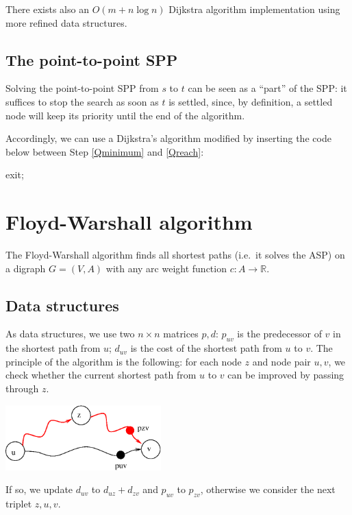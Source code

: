 \documentclass[a4paper]{book}
\theoremstyle{changebreak}                %
\begin{document}
There exists also an $O(m+n\log n)$ Dijkstra
algorithm implementation using more refined
data structures.

\subsection{The point-to-point SPP}
Solving the point-to-point SPP from $s$ to $t$ can be
seen as a ``part'' of the SPP: it suffices to stop the search as soon
as $t$ is settled, since, by definition, a settled node will keep its
priority until the end of the algorithm.

Accordingly, we can use a Dijkstra's
algorithm modified by inserting the code
below between Step \ref{Qminimum} and \ref{Qreach}:
\begin{algorithmic}
  \STATE exit;
\ENDIF
\end{algorithmic}

\section{Floyd-Warshall algorithm}
The Floyd-Warshall algorithm finds all
shortest paths (i.e.~it solves the
ASP) on a digraph $G=(V,A)$ with any arc
weight function $c:A\to\mathbb{R}$.

\subsection{Data structures}
As data structures, we use two $n\times n$ matrices $p,d$: $p_{uv}$ is
the predecessor of $v$ in the shortest path from
$u$; $d_{uv}$ is the cost of the shortest path from $u$ to $v$. The
principle of the algorithm is the following: for each node $z$ and
node pair $u,v$, we check whether the current
shortest path from $u$ to $v$ can be improved by passing through $z$.
\begin{center}
\includegraphics[width=6cm]{FW}
\end{center}
If so, we update $d_{uv}$ to $d_{uz}+d_{zv}$ and $p_{uv}$ to
$p_{zv}$, otherwise we consider the next triplet $z,u,v$.
\end{document}
